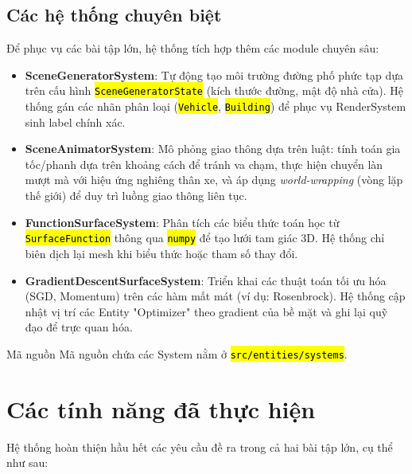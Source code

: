 \documentclass[a4paper]{article}
\newcommand{\code}[1]{\hl{\texttt{#1}}}
\begin{document}
\subsection{Các hệ thống chuyên biệt}
\hspace{12pt}
Để phục vụ các bài tập lớn, hệ thống tích hợp thêm các module chuyên sâu:
\begin{itemize}
    \item \textbf{SceneGeneratorSystem}: Tự động tạo môi trường đường phố phức tạp dựa trên cấu hình \code{SceneGeneratorState} (kích thước đường, mật độ nhà cửa). Hệ thống gán các nhãn phân loại (\code{Vehicle}, \code{Building}) để phục vụ RenderSystem sinh label chính xác.
    \item \textbf{SceneAnimatorSystem}: Mô phỏng giao thông dựa trên luật: tính toán gia tốc/phanh dựa trên khoảng cách để tránh va chạm, thực hiện chuyển làn mượt mà với hiệu ứng nghiêng thân xe, và áp dụng \textit{world-wrapping} (vòng lặp thế giới) để duy trì luồng giao thông liên tục.
    \item \textbf{FunctionSurfaceSystem}: Phân tích các biểu thức toán học từ \code{SurfaceFunction} thông qua \code{numpy} để tạo lưới tam giác 3D. Hệ thống chỉ biên dịch lại mesh khi biểu thức hoặc tham số thay đổi.
    \item \textbf{GradientDescentSurfaceSystem}: Triển khai các thuật toán tối ưu hóa (SGD, Momentum) trên các hàm mất mát (ví dụ: Rosenbrock). Hệ thống cập nhật vị trí các Entity "Optimizer" theo gradient của bề mặt và ghi lại quỹ đạo để trực quan hóa.
\end{itemize}

\begin{sourcecoderemark}{Mã nguồn}
Mã nguồn chứa các System nằm ở \code{src/entities/systems}.
\end{sourcecoderemark}


\section{Các tính năng đã thực hiện}
\hspace{12pt}
Hệ thống hoàn thiện hầu hết các yêu cầu đề ra trong cả hai bài tập lớn, cụ thể như sau:
\end{document}

